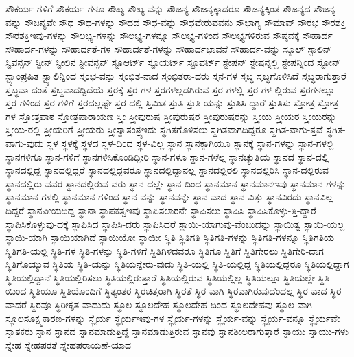 {ಸೌಕರ್ಯ-ಗಳಿಗೆ
ಸೌಕರ್ಯ-ಗಳೂ
ಸೌಖ್ಯ
ಸೌಖ್ಯ-ವನ್ನು
ಸೌಜನ್ಯ
ಸೌಜನ್ಯಕ್ಕಾದರೂ
ಸೌಜನ್ಯಕ್ಕಿಂತ
ಸೌಜನ್ಯದ
ಸೌಜನ್ಯ-ವನ್ನು
ಸೌಜನ್ಯವೇ
ಸೌಧ
ಸೌಧ-ಗಳನ್ನು
ಸೌಧದ
ಸೌಧ-ವನ್ನು
ಸೌಧವೇರುವವನು
ಸೌಭಾಗ್ಯ
ಸೌಮಾವ್
ಸೌರಭ
ಸೌರಶಕ್ತಿ
ಸೌರಶಕ್ತಿಇವು-ಗಳನ್ನು
ಸೌಲಭ್ಯ-ಗಳನ್ನು
ಸೌಲಭ್ಯ-ಗಳನ್ನೂ
ಸೌಲಭ್ಯ-ಗಳಿಂದ
ಸೌಲಭ್ಯಗಳಿರುವ
ಸೌಷ್ಠವಕ್ಕೆ
ಸೌಹಾರ್ದ
ಸೌಹಾರ್ದ-ಗಳನ್ನು
ಸೌಹಾರ್ದತೆ-ಗಳ
ಸೌಹಾರ್ದತೆ-ಗಳನ್ನು
ಸೌಹಾರ್ದಭಾವನೆ
ಸೌಹಾರ್ದ-ವನ್ನು
ಸ್ಕೂಲ್
ಸ್ಟಾಲಿನ್
ಸ್ಟಿವನ್ಸನ್
ಸ್ಟೀನ್
ಸ್ಟೀಲಿನ
ಸ್ಟೀವನ್ಸನ್
ಸ್ಟೂಆರ್ಟ್
ಸ್ಟೂಯರ್ಟ್
ಸ್ಟೂವರ್ಟ್
ಸ್ಟೇಷನ್
ಸ್ಟೇಷನ್ನಲ್ಲಿ
ಸ್ಟೇಷನ್ನಿಂದ
ಸ್ಟೋನ್
ಸ್ಟ್ಯಾಂಪ್ರಹಿತ
ಸ್ಟ್ಯಾಲಿನ್ನಿಂದ
ಸ್ತಂಭ-ವನ್ನು
ಸ್ತಂಭಿತ-ನಾದ
ಸ್ತಂಭಿತರಾ-ದರು
ಸ್ತನ-ಗಳ
ಸ್ತಬ್ಧ
ಸ್ತಬ್ಧಗೊಳಿಸಿದೆ
ಸ್ತಬ್ಧರಾಗುತ್ತಾರೆ
ಸ್ತಬ್ಧವಾ-ದಂತೆ
ಸ್ತಬ್ಧವಾದದ್ದಿದೆಯೆ
ಸ್ತರಕ್ಕೆ
ಸ್ತರ-ಗಳ
ಸ್ತರಗಳಲ್ಲಡಗಿರುವ
ಸ್ತರ-ಗಳಲ್ಲಿ
ಸ್ತರ-ಗಳ-ಲ್ಲಿರುವ
ಸ್ತರಗಳಲ್ಲೂ
ಸ್ತರ-ಗಳಿಂದ
ಸ್ತರ-ಗಳಿಗೆ
ಸ್ತರದಲ್ಲಷ್ಟೇ
ಸ್ತರ-ದಲ್ಲಿ
ಸ್ತಿಮಿತ
ಸ್ತುತಿ
ಸ್ತುತಿ-ಯನ್ನು
ಸ್ತುತಿಸಿ-ದ್ದಾರೆ
ಸ್ತುತಿಸು
ಸ್ತೋತ್ರ
ಸ್ತೋತ್ರ-ಗಳ
ಸ್ತೋತ್ರಪಾಠ
ಸ್ತೋತ್ರಪಾರಾಯಣ
ಸ್ತ್ರೀ
ಸ್ತ್ರೀಪುರುಷ
ಸ್ತ್ರೀಪುರುಷರ
ಸ್ತ್ರೀಪುರುಷರನ್ನು
ಸ್ತ್ರೀಯ
ಸ್ತ್ರೀಯರ
ಸ್ತ್ರೀಯರನ್ನು
ಸ್ತ್ರೀಯ-ರಲ್ಲಿ
ಸ್ತ್ರೀಯರಿಗೆ
ಸ್ತ್ರೀಯರು
ಸ್ತ್ರೀಸ್ವಾತಂತ್ರ್ಯಇದು
ಸ್ಥಗಿತಗೊಳಿಸಲು
ಸ್ಥಗಿತವಾಗದಿದ್ದರೂ
ಸ್ಥಗಿತ-ವಾಗು-ತ್ತವೆ
ಸ್ಥಗಿತ-ವಾಗು-ವುದು
ಸ್ಥಳ
ಸ್ಥಳಕ್ಕೆ
ಸ್ಥಳದ
ಸ್ಥಳ-ದಿಂದ
ಸ್ಥಳ-ವಿಲ್ಲ
ಸ್ಥಾನ
ಸ್ಥಾನಕ್ಕಾಗಿಯೂ
ಸ್ಥಾನಕ್ಕೆ
ಸ್ಥಾನ-ಗಳನ್ನು
ಸ್ಥಾನ-ಗಳಲ್ಲಿ
ಸ್ಥಾನಗಳಿಗೂ
ಸ್ಥಾನ-ಗಳಿಗೆ
ಸ್ಥಾನಗಳಿಸಿಕೊಂಡಿದ್ದೀರಿ
ಸ್ಥಾನ-ಗಳೂ
ಸ್ಥಾನ-ಗಳೆಲ್ಲ
ಸ್ಥಾನಚ್ಯುತಿಯ
ಸ್ಥಾನದ
ಸ್ಥಾನ-ದಲ್ಲಿ
ಸ್ಥಾನದಲ್ಲಿದ್ದ
ಸ್ಥಾನದಲ್ಲಿದ್ದರೆ
ಸ್ಥಾನದಲ್ಲಿದ್ದವರೂ
ಸ್ಥಾನದಲ್ಲಿದ್ದಾನಲ್ಲ
ಸ್ಥಾನದಲ್ಲಿರಲಿ
ಸ್ಥಾನದಲ್ಲಿರಿಸಿ
ಸ್ಥಾನ-ದಲ್ಲಿರುವ
ಸ್ಥಾನದಲ್ಲಿರು-ವವರ
ಸ್ಥಾನದಲ್ಲಿರುವ-ವರು
ಸ್ಥಾನ-ದಲ್ಲೇ
ಸ್ಥಾನ-ದಿಂದ
ಸ್ಥಾನಮಾನ
ಸ್ಥಾನಮಾನಇವು
ಸ್ಥಾನಮಾನ-ಗಳನ್ನು
ಸ್ಥಾನಮಾನ-ಗಳಲ್ಲಿ
ಸ್ಥಾನಮಾನ-ಗಳಿಂದ
ಸ್ಥಾನ-ವನ್ನು
ಸ್ಥಾನವನ್ನೇ
ಸ್ಥಾನ-ವಾದ
ಸ್ಥಾನ-ವಿತ್ತು
ಸ್ಥಾನವಿರದು
ಸ್ಥಾನವಿಲ್ಲ-ದಿದ್ದರೆ
ಸ್ಥಾನವೀಯದಿದ್ದ
ಸ್ಥಾನಾ
ಸ್ಥಾಪಕತ್ವಇವು
ಸ್ಥಾಪಿಸಲಾರನೇ
ಸ್ಥಾಪಿಸಲು
ಸ್ಥಾಪಿಸಿ
ಸ್ಥಾಪಿಸಿಕೊಳ್ಳು-ತ್ತಿ-ದ್ದಾರೆ
ಸ್ಥಾಪಿಸಿಕೊಳ್ಳುವು-ದಕ್ಕೆ
ಸ್ಥಾಪಿಸಿದ
ಸ್ಥಾಪಿಸಿ-ದರು
ಸ್ಥಾಪಿಸಿದರೆ
ಸ್ಥಾಯಿ-ಯಾಗುವು-ವೆಂಬುದನ್ನು
ಸ್ಥಾಯಿತ್ವ
ಸ್ಥಾಯಿ-ಯಲ್ಲ
ಸ್ಥಾಯಿ-ಯಾಗಿ
ಸ್ಥಾಯಿಯಾಗಿದೆ
ಸ್ಥಾಯಿಯೋ
ಸ್ಥಾಯೀ
ಸ್ಥಿತಿ
ಸ್ಥಿತಿಗತಿ
ಸ್ಥಿತಿಗತಿ-ಗಳನ್ನು
ಸ್ಥಿತಿಗತಿ-ಗಳನ್ನೂ
ಸ್ಥಿತಿಗತಿಯ
ಸ್ಥಿತಿಗತಿ-ಯಲ್ಲಿ
ಸ್ಥಿತಿ-ಗಳ
ಸ್ಥಿತಿ-ಗಳನ್ನು
ಸ್ಥಿತಿ-ಗಳಿಗೆ
ಸ್ಥಿತಿಗಿಳಿದವರೂ
ಸ್ಥಿತಿಗೂ
ಸ್ಥಿತಿಗೆ
ಸ್ಥಿತಿಗೇರಲು
ಸ್ಥಿತಿಗೇರಿ-ದಾಗ
ಸ್ಥಿತಿಗೊಯ್ಯುವ
ಸ್ಥಿತಿಯ
ಸ್ಥಿತಿ-ಯನ್ನು
ಸ್ಥಿತಿಯನ್ನೇರು-ವುದು
ಸ್ಥಿತಿ-ಯಲ್ಲಿ
ಸ್ಥಿತಿ-ಯಲ್ಲಿದ್ದ
ಸ್ಥಿತಿಯಲ್ಲಿದ್ದರೂ
ಸ್ಥಿತಿಯಲ್ಲಿದ್ದಾಗ
ಸ್ಥಿತಿಯಲ್ಲಿದ್ದಾನೆ
ಸ್ಥಿತಿಯಲ್ಲಿರಿಸಲು
ಸ್ಥಿತಿಯಲ್ಲಿರುತ್ತಾರೆ
ಸ್ಥಿತಿಯಲ್ಲಿರುವ
ಸ್ಥಿತಿಯಲ್ಲಿಲ್ಲ
ಸ್ಥಿತಿಯಲ್ಲೂ
ಸ್ಥಿತಿಯಲ್ಲೇ
ಸ್ಥಿತಿ-ಯಿಂದ
ಸ್ಥಿತಿಯೂ
ಸ್ಥಿತಿಯೊಂದಿಗೆ
ಸ್ಥಿತ್ಯಂತರ
ಸ್ಥಿರಚಿತ್ತರಾಗಿ
ಸ್ಥಿರತೆ
ಸ್ಥಿರ-ವಾಗಿ
ಸ್ಥಿರವಾಗಿರುವುದೆಂದಲ್ಲ
ಸ್ಥಿರ-ವಾದ
ಸ್ಥಿರ-ವಾದರೆ
ಸ್ಥಿರವೂ
ಸ್ಥಿರೀಕೃತ-ವಾದುದು
ಸ್ಥೂಲ
ಸ್ಥೂಲದೇಹ
ಸ್ಥೂಲದೇಹ-ದಿಂದ
ಸ್ಥೂಲದೇಹವು
ಸ್ಥೂಲ-ವಾಗಿ
ಸ್ಥೂಲಸೂಕ್ಷ್ಮಕಾರಣ-ಗಳನ್ನು
ಸ್ಥೈರ್ಯ
ಸ್ಥೈರ್ಯಇವು-ಗಳ
ಸ್ಥೈರ್ಯ-ಗಳನ್ನು
ಸ್ಥೈರ್ಯ-ವನ್ನು
ಸ್ಥೈರ್ಯ-ವನ್ನೂ
ಸ್ಥೈರ್ಯವೇ
ಸ್ನಾತಕರು
ಸ್ನಾನ
ಸ್ನಾನದ
ಸ್ನಾನಮಾಡುತ್ತಿದ್ದೆ
ಸ್ನಾನಮಾಡುತ್ತಿರುವ
ಸ್ನಾನವು
ಸ್ನಾನಶೀಲರಾಗುತ್ತಾರೆ
ಸ್ನಾಯು
ಸ್ನಾಯು-ಗಳು
ಸ್ನೇಹ
ಸ್ನೇಹಪರತೆ
ಸ್ನೇಹಪರಾಯಣೆ-ಯಾದ
}

